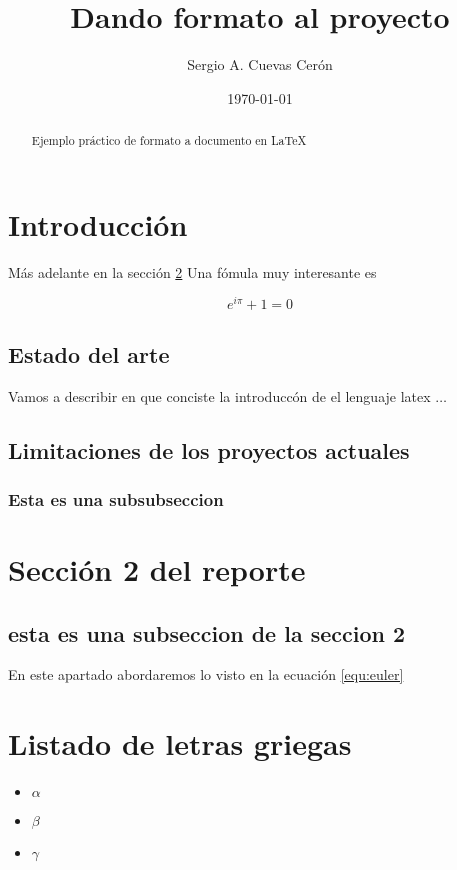 \documentclass{article}
\title{Dando formato al proyecto}
\author{Sergio A. Cuevas Cerón}
\date{\today}
\begin{document}
\maketitle %

\begin{abstract}
	Ejemplo práctico de formato a documento en \LaTeX
\end{abstract}

\section{Introducción}
\label{sec:intro}

Más adelante en la sección \ref{sec:sec2}
Una fómula muy interesante es

\begin{equation}
\label{equ:euler}
	e^{i\pi}+1=0
\end{equation}

\subsection{Estado del arte}

Vamos a describir en que conciste la introduccón de el lenguaje latex $\ldots$

\subsection{Limitaciones de los proyectos actuales}

\subsubsection{Esta es una subsubseccion}

\section{Sección 2 del reporte}
\label{sec:sec2}

\subsection{esta es una subseccion de la seccion 2}

En este apartado abordaremos lo visto en la ecuación \ref{equ:euler}

\section{Listado de letras griegas}
\begin{itemize} %
	\item $\alpha$
	\item $\beta$
	\item $\gamma$

\end{itemize}
\end{document}

